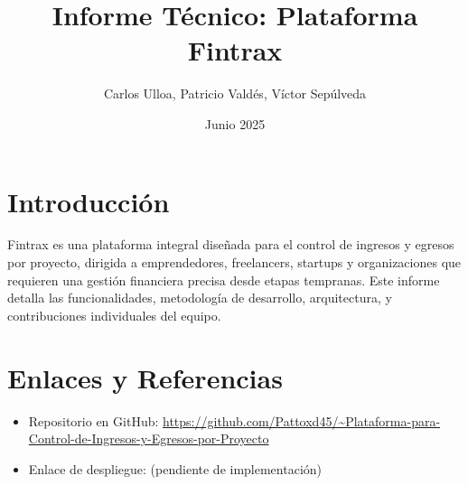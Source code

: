\documentclass[12pt, a4paper]{article}
\title{Informe Técnico: Plataforma Fintrax}
\author{Carlos Ulloa, Patricio Valdés, Víctor Sepúlveda}
\date{Junio 2025}
\begin{document}
\begin{titlepage}
    \maketitle
    \thispagestyle{empty} %
\end{titlepage}
\newpage
\tableofcontents
\thispagestyle{empty} %
\newpage
\section{Introducción}
Fintrax es una plataforma integral diseñada para el control de ingresos y egresos por proyecto, dirigida a emprendedores, freelancers, startups y organizaciones que requieren una gestión financiera precisa desde etapas tempranas. Este informe detalla las funcionalidades, metodología de desarrollo, arquitectura, y contribuciones individuales del equipo.
\newpage
% 
% 
% 
\section{Enlaces y Referencias}
\begin{itemize}
    \item Repositorio en GitHub: \url{https://github.com/Pattoxd45/~Plataforma-para-Control-de-Ingresos-y-Egresos-por-Proyecto}
    \item Enlace de despliegue: (pendiente de implementación)
\end{itemize}

\end{document}
